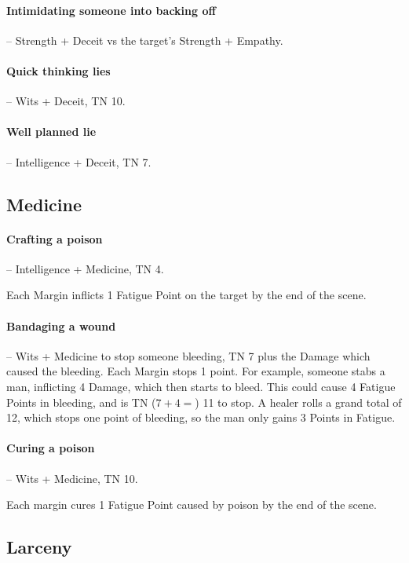 \begin{multicols}{2}
\paragraph{Intimidating someone into backing off} -- Strength + Deceit vs the target's Strength + Empathy.

\paragraph{Quick thinking lies} -- Wits + Deceit, TN 10.

\paragraph{Well planned lie} -- Intelligence + Deceit, TN 7.

\subsection{Medicine}

\paragraph{Crafting a poison} -- Intelligence + Medicine, TN 4.

Each Margin inflicts 1 Fatigue Point on the target by the end of the scene.

\paragraph{Bandaging a wound} -- Wits + Medicine to stop someone bleeding, TN 7 plus the Damage which caused the bleeding.
Each Margin stops 1 point.
For example, someone stabs a man, inflicting 4 Damage, which then starts to bleed.
This could cause 4 Fatigue Points in bleeding, and is TN ($7 + 4 = $) 11 to stop.
A healer rolls a grand total of 12, which stops one point of bleeding, so the man only gains 3 Points in Fatigue.

\paragraph{Curing a poison} -- Wits + Medicine, TN 10.

Each margin cures 1 Fatigue Point caused by poison by the end of the scene.

\subsection{Larceny}


\end{multicols}
